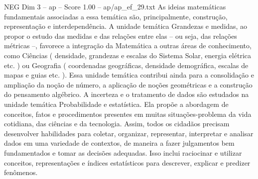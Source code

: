 \begin{textsample}{NEG Dim 3 – ap – Score 1.00 – ap/ap\_ef\_29.txt}
As ideias matemáticas fundamentais associadas a essa temática são, principalmente, construção, representação e interdependência.
A unidade temática Grandezas e medidas, ao propor o estudo das medidas e das relações entre elas – ou seja, das relações métricas –, favorece a integração da Matemática a outras áreas de conhecimento, como Ciências ( densidade, grandezas e escalas do Sistema Solar, energia elétrica etc. ) ou Geografia ( coordenadas geográficas, densidade demográfica, escalas de mapas e guias etc. ).
Essa unidade temática contribui ainda para a consolidação e ampliação da noção de número, a aplicação de noções geométricas e a construção do pensamento algébrico.
A incerteza e o tratamento de dados são estudados na unidade temática Probabilidade e estatística.
Ela propõe a abordagem de conceitos, fatos e procedimentos presentes em muitas situações-problema da vida cotidiana, das ciências e da tecnologia.
Assim, todos os cidadãos precisam desenvolver habilidades para coletar, organizar, representar, interpretar e analisar dados em uma variedade de contextos, de maneira a fazer julgamentos bem fundamentados e tomar as decisões adequadas.
Isso inclui raciocinar e utilizar conceitos, representações e índices estatísticos para descrever, explicar e predizer fenômenos.

\end{textsample}
